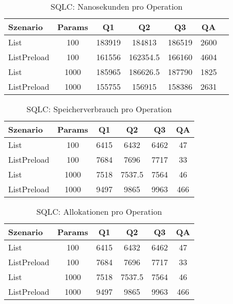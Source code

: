 
\begin{table}[ht]
\centering
\caption{SQLC: Nanosekunden pro Operation}
\begin{tabular}{lcccccc}
\toprule
Szenario & Params & Q1 & Q2 & Q3 & QA \\
\midrule
	List & 100 & 183919 & 184813 & 186519 & 2600 \\
	ListPreload & 100 & 161556 & 162354.5 & 166160 & 4604 \\
	List & 1000 & 185965 & 186626.5 & 187790 & 1825 \\
	ListPreload & 1000 & 155755 & 156915 & 158386 & 2631 \\
\bottomrule
\end{tabular}
\label{tab:benchmark_sqlc_nsperop}
\end{table}
	
\begin{table}[ht]
\centering
\caption{SQLC: Speicherverbrauch pro Operation}
\begin{tabular}{lccccc}
\toprule
Szenario & Params & Q1 & Q2 & Q3 & QA \\
\midrule
	List & 100 & 6415 & 6432 & 6462 & 47 \\
	ListPreload & 100 & 7684 & 7696 & 7717 & 33 \\
	List & 1000 & 7518 & 7537.5 & 7564 & 46 \\
	ListPreload & 1000 & 9497 & 9865 & 9963 & 466 \\
\bottomrule
\end{tabular}
\label{tab:benchmark_sqlc_bytesperop}
\end{table}
	
\begin{table}[ht]
\centering
\caption{SQLC: Allokationen pro Operation}
\begin{tabular}{lccccc}
\toprule
Szenario & Params & Q1 & Q2 & Q3 & QA \\
\midrule
	List & 100 & 6415 & 6432 & 6462 & 47 \\
	ListPreload & 100 & 7684 & 7696 & 7717 & 33 \\
	List & 1000 & 7518 & 7537.5 & 7564 & 46 \\
	ListPreload & 1000 & 9497 & 9865 & 9963 & 466 \\
\bottomrule
\end{tabular}
\label{tab:benchmark_sqlc_allocsperop}
\end{table}
	